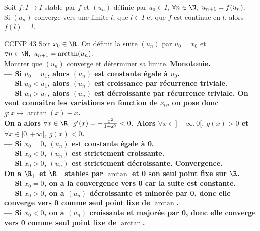 \documentclass[11pt]{article}
\begin{document}
\vspace*{-0.4cm}

\begin{rappel}{}{}
    Soit $f:I\to I$ stable par $f$ et $(u_n)$ définie par $u_0\in I$, $\forall n \in \N,~u_{n+1}=f(u_n)$.\\
    Si $(u_n)$ converge vers une limite $l$, que $l\in I$ et que $f$ est continue en $l$, alors $f(l)=l$. 
\end{rappel}

\vspace*{-0.4cm}

\begin{ex}{CCINP 43}{}
    Soit $x_0\in\R$. On définit la suite $(u_n)$ par $u_0=x_0$ et $\forall n \in\N,~u_{n+1}=\arctan(u_n)$.\\
    Montrer que $(u_n)$ converge et déterminer sa limite.
    \tcblower
    \bf{Monotonie.}\\
    --- Si $u_0=u_1$, alors $(u_n)$ est constante égale à $u_0$.\\
    --- Si $u_0<u_1$, alors $(u_n)$ est croissance par récurrence triviale.\\
    --- Si $u_0>u_1$, alors $(u_n)$ est décroissante par récurrence triviale.\n
    On veut connaitre les variations en fonction de $x_0$, on pose donc $g:x\mapsto\arctan(x)-x$.\\
    On a alors $\forall x \in \R, ~ g'(x)=-\frac{x^2}{1+x^2}<0$. Alors $\forall x \in ]-\infty,0[,~g(x)>0$ et $\forall x \in ]0,+\infty[,~g(x)<0$.\\
    --- Si $x_0=0$, $(u_n)$ est constante égale à 0.\\
    --- Si $x_0<0$, $(u_n)$ est strictement croissante.\\
    --- Si $x_0>0$, $(u_n)$ est strictement décroissante.\n
    \bf{Convergence.}\\
    On a $\R_+$ et $\R_-$ stables par $\arctan$ et 0 son seul point fixe sur $\R$.\\
    --- Si $x_0=0$, on a la convergence vers 0 car la suite est constante.\\
    --- Si $x_0>0$, on a $(u_n)$ décroissante et minorée par 0, donc elle converge vers 0 comme seul point fixe de $\arctan$.\\
    --- Si $x_0<0$, on a $(u_n)$ croissante et majorée par 0, donc elle converge vers 0 comme seul point fixe de $\arctan$.
\end{ex}

\vspace*{-0.4cm}
\end{document}
